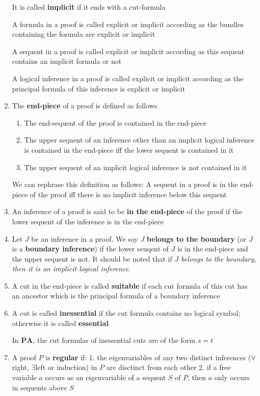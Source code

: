 \documentclass[11pt]{article}
\def \PA {\textbf{PA}}
\begin{document}
\begin{definition}[]
\begin{enumerate}
It is called \textbf{implicit} if it ends with a cut-formula

A formula in a proof is called explicit or implicit according as the bundles containing the
formula are explicit or implicit

A sequent in a proof is called explicit or implicit according as this sequent contains an
implicit formula or not

A logical inference in a proof is called explicit or implicit according as the principal
formula of this inference is explicit or implicit
\item The \textbf{end-piece} of a proof is defined as follows
\begin{enumerate}
\item The end-sequent of the proof is contained in the end-piece
\item The upper sequent of an inference other than an implicit logical inference is contained in
the end-piece iff the lower sequent is contained in it
\item The upper sequent of an implicit logical inference is not contained in it
\end{enumerate}

We can rephrase this definition as follows: A sequent in a proof is in the end-piece of the
proof iff there is no implicit inference below this sequent
\item An inference of a proof is said to be \textbf{in the end-piece} of the proof if the lower sequent of
the inference is in the end-piece
\item Let \(J\) be an inference in a proof. We say \(J\) \textbf{belongs to the boundary} (or \(J\) is a
\textbf{boundary inference}) if the lower seuqent of \(J\) is in the end-piece and the upper sequent is
not. It should be noted that if \emph{\(J\) belongs to the boundary, then it is an implicit logical inference}.
\item A cut in the end-piece is called \textbf{suitable} if each cut formula of this cut has an ancestor
which is the principal formula of a boundary inference
\item A cut is called \textbf{inessential} if the cut formula contains no logical symbol; otherwise it is
called \textbf{essential}

In \(\PA\), the cut formulas of inessential cuts are of the form \(s=t\)
\item A proof \(P\) is \textbf{regular} if: 1. the eigenvariables of any two distinct inferences
(\(\forall\)right, \(\exists\)left or induction) in \(P\) are disctinct from each other 2. if
a free variable \(a\) occurs as an eigenvariable of a sequent \(S\) of \(P\), then \(a\) only
occurs in sequents above \(S\)
\end{enumerate}
\end{definition}
\end{document}
